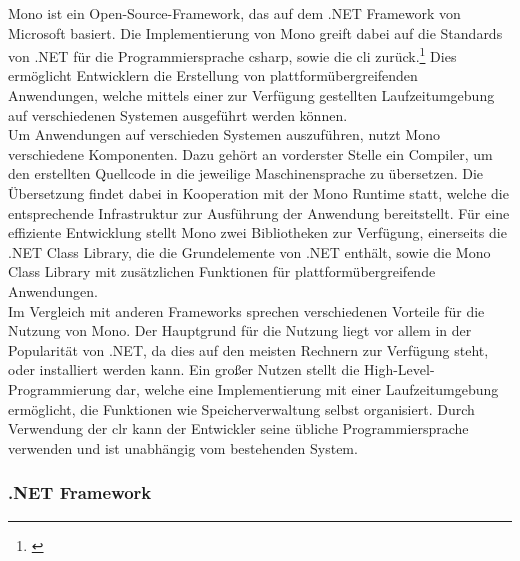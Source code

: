 Mono ist ein Open-Source-Framework, das auf dem .NET Framework von Microsoft basiert. Die Implementierung von Mono greift dabei auf die Standards von .NET für die Programmiersprache \gls{csharp}, sowie die \gls{cli} zurück.\footnote{\citep[vgl.][About Mono]{MonoProject.AboutMono}\label{note41}} Dies ermöglicht Entwicklern die Erstellung von plattformübergreifenden Anwendungen, welche mittels einer zur Verfügung gestellten Laufzeitumgebung auf verschiedenen Systemen ausgeführt werden können.\\
Um Anwendungen auf verschieden Systemen auszuführen, nutzt Mono verschiedene Komponenten. Dazu gehört an vorderster Stelle ein Compiler, um den erstellten Quellcode in die jeweilige Maschinensprache zu übersetzen. Die Übersetzung findet dabei in Kooperation mit der Mono Runtime statt, welche die entsprechende Infrastruktur zur Ausführung der Anwendung bereitstellt. Für eine effiziente Entwicklung stellt Mono zwei Bibliotheken zur Verfügung, einerseits die .NET Class Library, die die Grundelemente von .NET enthält, sowie die Mono Class Library mit zusätzlichen Funktionen für plattformübergreifende Anwendungen.\\
Im Vergleich mit anderen Frameworks sprechen verschiedenen Vorteile für die Nutzung von Mono. Der Hauptgrund für die Nutzung liegt vor allem in der Popularität von .NET, da dies auf den meisten Rechnern zur Verfügung steht, oder installiert werden kann. Ein großer Nutzen stellt die High-Level-Programmierung dar, welche eine Implementierung mit einer Laufzeitumgebung ermöglicht, die Funktionen wie Speicherverwaltung selbst organisiert. Durch Verwendung der \gls{clr} kann der Entwickler seine übliche Programmiersprache verwenden und ist unabhängig vom bestehenden System.

\subsubsection{.NET Framework}\label{net}

